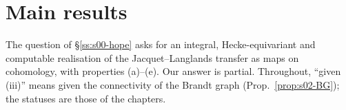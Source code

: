 \section{Main results}\label{ss:s00-question}

The question of \S\ref{ss:s00-hope} asks for an integral, Hecke-equivariant and computable realisation of the
Jacquet--Langlands transfer as maps on cohomology, with properties (a)--(e). Our answer is partial. Throughout, ``given (iii)''
means given the connectivity of the Brandt graph (Prop.~\ref{prop:s02-BG}); the statuses are those of the chapters.

